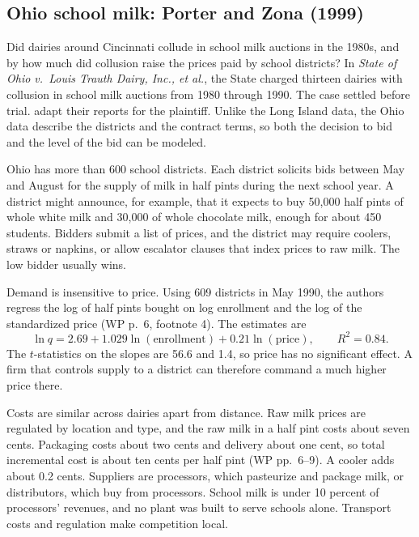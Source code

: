 \subsection{Ohio school milk: Porter and Zona (1999)}\label{sec:13-pz99}

Did dairies around Cincinnati collude in school milk auctions in the 1980s, and by how much did collusion raise the
prices paid by school districts? In \emph{State of Ohio v.\ Louis Trauth Dairy, Inc., et al.}, the State charged
thirteen dairies with collusion in school milk auctions from 1980 through 1990. The case settled before trial.
\citet{PorterZona1999} adapt their reports for the plaintiff. Unlike the Long Island data, the Ohio data describe the
districts and the contract terms, so both the decision to bid and the level of the bid can be modeled.

Ohio has more than 600 school districts. Each district solicits bids between May and August for the supply of milk
in half pints during the next school year. A district might announce, for example, that it expects to buy 50,000 half
pints of whole white milk and 30,000 of whole chocolate milk, enough for about 450 students. Bidders submit a list of
prices, and the district may require coolers, straws or napkins, or allow escalator clauses that index prices to raw
milk. The low bidder usually wins.

Demand is insensitive to price. Using 609 districts in May 1990, the authors regress the log of half pints bought on
log enrollment and the log of the standardized price (WP p.~6, footnote 4). The estimates are
\begin{equation*}
  \ln q = 2.69 + 1.029 \ln(\text{enrollment}) + 0.21 \ln(\text{price}), \qquad R^2 = 0.84 .
\end{equation*}
The $t$-statistics on the slopes are 56.6 and 1.4, so price has no significant effect. A firm that controls supply to a
district can therefore command a much higher price there.

Costs are similar across dairies apart from distance. Raw milk prices are regulated by location and type, and the
raw milk in a half pint costs about seven cents. Packaging costs about two cents and delivery about one cent, so total
incremental cost is about ten cents per half pint (WP pp.~6--9). A cooler adds about 0.2 cents. Suppliers are
processors, which pasteurize and package milk, or distributors, which buy from processors. School milk is under 10
percent of processors' revenues, and no plant was built to serve schools alone. Transport costs and regulation make
competition local.

